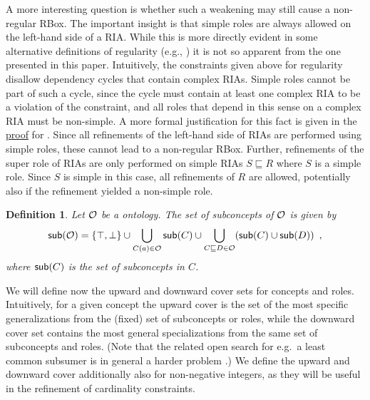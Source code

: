 \documentclass[
]{ceurart}
\newtheorem{definition}{Definition}
\begin{document}
A more interesting question is whether such a weakening may still cause a non-regular RBox. The important insight is that simple roles are always allowed on the left-hand side of a RIA. While this is more directly evident in some alternative definitions of regularity (e.g., \cite{rudolph2011foundations}) it is not so apparent from the one presented in this paper.
%
Intuitively, the constraints given above for regularity disallow dependency cycles that contain complex RIAs. Simple roles cannot be part of such a cycle, since the cycle must contain at least one complex RIA to be a violation of the constraint, and all roles that depend in this sense on a complex RIA must be non-simple. 
%
A more formal justification for this fact is given in the \hyperref[proof:regularity]{proof} for .
Since all refinements of the left-hand side of RIAs are performed using simple roles, these cannot lead to a non-regular RBox. Further, refinements of the super role of RIAs are only performed on simple RIAs $S \sqsubseteq R$ where $S$ is a simple role. Since $S$ is simple in this case, all refinements of $R$ are allowed, potentially also if the refinement yielded a non-simple role.

\begin{definition}
  Let $\mathcal{O}$ be a \SROIQ ontology. The set of \emph{subconcepts} of $\mathcal{O}$ is given by 
  {\footnotesize
  \begin{align*}
    \mathop{\mathsf{sub}}(\mathcal{O}) = \{\top, \bot\} \cup \bigcup_{C(a) \in \mathcal{O}} \mathop{\mathsf{sub}}(C) \cup \bigcup_{C \sqsubseteq D \in \mathcal{O}} ( \mathop{\mathsf{sub}}(C) \cup \mathop{\mathsf{sub}}(D) ) \enspace,
  \end{align*}
  }
  where $\mathop{\mathsf{sub}}(C)$ is the set of \emph{subconcepts} in $C$.
\end{definition}

We will define now the upward and downward cover sets for concepts and roles. Intuitively, for a given concept the upward cover is the set of the most specific generalizations from the (fixed) set of subconcepts or roles, while the downward cover set contains the most general specializations from the same set of subconcepts and roles. (Note that the related open search for e.g.\ a least common subsumer is in general a harder problem \cite{baader2003least}.) We define the upward and downward cover additionally also for non-negative integers, as they will be useful in the refinement of cardinality constraints.
\end{document}
